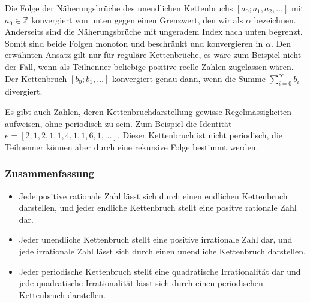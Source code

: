 Die Folge der Näherungsbrüche des unendlichen Kettenbruchs
$[a_0;a_1,a_2,\dots]$ mit $a_0 \in \mathbb{Z}$ konvergiert 
von unten gegen einen Grenzwert, den wir als $\alpha$
bezeichnen. Anderseits sind die Näherungsbrüche mit ungeradem
Index nach unten begrenzt. Somit sind beide Folgen monoton und beschränkt 
und konvergieren in $\alpha$. Den erwähnten Ansatz gilt nur für reguläre Kettenbrüche, es 
wäre zum Beispiel nicht der Fall, wenn als Teilnenner beliebige positive reelle Zahlen 
zugelassen wären. Der Kettenbruch $[b_0;b_1,\dots]$ konvergiert genau dann, wenn die Summe
$\sum\limits_{i=0}^\infty b_i $ divergiert.

Es gibt auch Zahlen, deren Kettenbruchdarstellung gewisse
Regelmässigkeiten aufweisen, ohne periodisch zu sein. Zum Beispiel
die Identität $e = [2;1,2,1,1,4,1,1,6,1,\dots]$. Dieser
Kettenbruch ist nicht periodisch, die Teilnenner können aber durch
eine rekursive Folge bestimmt werden.

\subsubsection{Zusammenfassung}
\begin{itemize}
\item
Jede positive rationale Zahl lässt sich durch einen endlichen
Kettenbruch darstellen, und jeder endliche Kettenbruch stellt eine
positve rationale Zahl dar.
\item
Jeder unendliche Kettenbruch stellt eine positive irrationale Zahl
dar, und jede irrationale Zahl lässt sich durch einen unendliche
Kettenbruch darstellen.
\item
Jeder periodische Kettenbruch stellt eine quadratische Irrationalität
dar und jede quadratische Irrationalität lässt sich durch einen
periodischen Kettenbruch darstellen.
\end{itemize}
